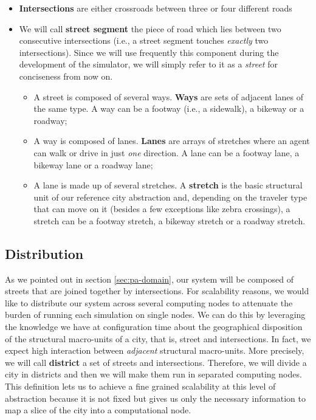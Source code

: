 \begin{itemize}
  \item \textbf{Intersections} are either crossroads between three or four
    different roads
  \item We will call \textbf{street segment} the piece of road which lies
    between two consecutive intersections (i.e., a street segment touches
    \textit{exactly} two intersections). Since we will use frequently this
    component during the development of the simulator, we will simply refer to
    it as a \textit{street} for conciseness from now on.
    \begin{itemize}
      \item A street is composed of several ways. \textbf{Ways} are sets of
        adjacent lanes of the same type. A way can be a footway (i.e., a
        sidewalk), a bikeway or a roadway;
      \item A way is composed of lanes. \textbf{Lanes} are arrays of stretches
        where an agent can walk or drive in just \textit{one} direction. A lane can be a footway lane,
        a bikeway lane or a roadway lane;
      \item A lane is made up of several stretches. A \textbf{stretch} is the
        basic structural unit of our reference city abstraction and, depending
        on the traveler type that can move on it (besides a few exceptions
        like zebra crossings), a stretch can be a footway stretch, a bikeway
        stretch or a roadway stretch.
    \end{itemize}
\end{itemize}


\subsection{Distribution}\label{sec:pa-distribution}
As we pointed out in section \ref{sec:pa-domain}, our system will be composed
of streets that are joined together by intersections.
For scalability reasons, we would like to distribute our system across several
computing nodes to attenuate the burden of running each simulation on single
nodes. We can do this by leveraging the knowledge we have at configuration time
about the geographical disposition of the structural macro-units of a city,
that is, street and intersections. In fact, we expect high interaction between
\textit{adjacent} structural macro-units.
More precisely, we will call \textbf{district} a set of streets and
intersections. Therefore, we will divide a city in districts and then we will
make them run in separated computing nodes. This definition lets us to achieve
a fine grained scalability at this level of abstraction because it is not
fixed but gives us only the necessary information to map a slice of the city
into a computational node.

